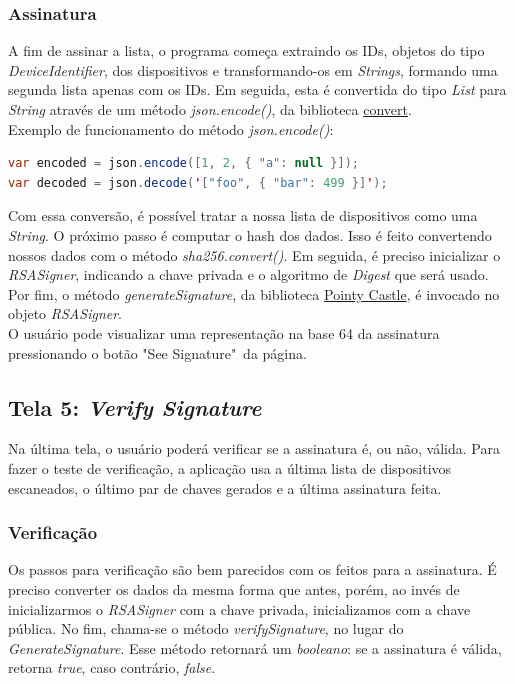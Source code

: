 \documentclass[a4paper,12pt]{article}
\begin{document}
\subsubsection{Assinatura}
A fim de assinar a lista, o programa começa extraindo os IDs, objetos do tipo \textit{DeviceIdentifier}, dos dispositivos e transformando-os em \textit{Strings}, formando uma segunda lista apenas com os IDs. Em seguida, esta é convertida do tipo \textit{List} para \textit{String} através de um método \textit{json.encode()}, da biblioteca \href{https://api.flutter.dev/flutter/dart-convert/dart-convert-library.html}{convert}.\\
Exemplo de funcionamento do método \textit{json.encode()}:
\begin{lstlisting}[language=java]
var encoded = json.encode([1, 2, { "a": null }]);
var decoded = json.decode('["foo", { "bar": 499 }]');
\end{lstlisting}
Com essa conversão, é possível tratar a nossa lista de dispositivos como uma \textit{String}. O próximo passo é computar o hash dos dados. Isso é feito convertendo nossos dados com o método \textit{sha256.convert()}. Em seguida, é preciso inicializar o \textit{RSASigner}, indicando a chave privada e o algoritmo de \textit{Digest} que será usado. Por fim, o método \textit{generateSignature}, da biblioteca \href{https://pub.dev/packages/pointycastle}{Pointy Castle}, é invocado no objeto \textit{RSASigner}.\\
O usuário pode visualizar uma representação na base 64 da assinatura pressionando o botão "See Signature"\, da página.
\subsection{Tela 5: \textit{Verify Signature}}
Na última tela, o usuário poderá verificar se a assinatura é, ou não, válida. Para fazer o teste de verificação, a aplicação usa a última lista de dispositivos escaneados, o último par de chaves gerados e a última assinatura feita.
\subsubsection{Verificação}
Os passos para verificação são bem parecidos com os feitos para a assinatura. É preciso converter os dados da mesma forma que antes, porém, ao invés de inicializarmos o \textit{RSASigner} com a chave privada, inicializamos com a chave pública. No fim, chama-se o método \textit{verifySignature}, no lugar do \textit{GenerateSignature}. Esse método retornará um \textit{booleano}: se a assinatura é válida, retorna \textit{true}, caso contrário, \textit{false}.
\newpage
\end{document}
